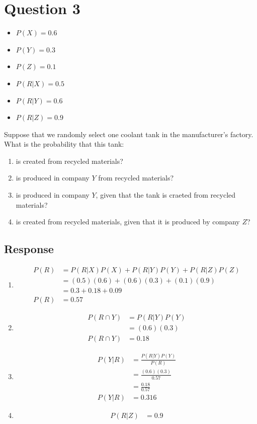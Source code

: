 \documentclass[13pt]{article}
\begin{document}
\newpage
\section*{Question 3}
\begin{itemize}
\item $P(X) = 0.6$
\item $P(Y) = 0.3$
\item $P(Z) = 0.1$
\item $P(R|X) = 0.5$
\item $P(R|Y) = 0.6$
\item $P(R|Z) = 0.9$
\end{itemize}
Suppose that we randomly select one coolant tank in the manufacturer's
factory. What is the probability that this tank:
\begin{enumerate}[label=\textbf{\alph*.}]
\item is created from recycled materials?
\item is produced in company $Y$ from recycled materials?
\item is produced in company $Y$, given that the tank is craeted from
  recycled materials?
\item is created from recycled materials, given that it is produced by
  company $Z$?
\end{enumerate}

\subsection*{Response}
\begin{enumerate}[label=\textbf{\alph*.}]
\item
  \begin{align*}
    P(R) &= P(R|X)P(X) + P(R|Y)P(Y) + P(R|Z)P(Z) \\
         &= (0.5)(0.6) + (0.6)(0.3) + (0.1)(0.9) \\
         &= 0.3 + 0.18 + 0.09 \\
    P(R) &= 0.57
  \end{align*}

\item
  \begin{align*}
    P(R \cap Y) &= P(R|Y)P(Y) \\
                &= (0.6)(0.3) \\
    P(R \cap Y) &= 0.18
  \end{align*}

\item
  \begin{align*}
    P(Y|R) &= \frac{P(R|Y)P(Y)}{P(R)} \\
           &= \frac{(0.6)(0.3)}{0.57} \\
           &= \frac{0.18}{0.57} \\
    P(Y|R) &= 0.316
  \end{align*}

\item
  \begin{align*}
    P(R|Z) &= 0.9
  \end{align*}
\end{enumerate}
\end{document}
